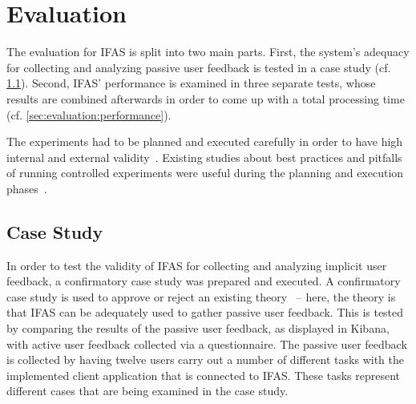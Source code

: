%
\chapter{Evaluation}
\label{ch:evaluation}

The evaluation for \acf{IFAS} is split into two main parts.
First, the system's adequacy for collecting and analyzing passive user feedback is tested in a case study (cf. \cref{sec:evaluation:user}).
Second, \ac{IFAS}' performance is examined in three separate tests, whose results are combined afterwards in order to come up with a total processing time (cf. \cref{sec:evaluation:performance}).


The experiments had to be planned and executed carefully in order to have high internal and external validity~\cite{Huitt2010}.
Existing studies about best practices and pitfalls of running controlled experiments were useful during the planning and execution phases~\cite{Kohavi2009}.


\section{Case Study}
\label{sec:evaluation:user}

In order to test the validity of \ac{IFAS} for collecting and analyzing implicit user feedback, a confirmatory case study was prepared and executed.
A confirmatory case study is used to approve or reject an existing theory~\cite{Easterbrook2008} -- here, the theory is that \ac{IFAS} can be adequately used to gather passive user feedback.
This is tested by comparing the results of the passive user feedback, as displayed in Kibana, with active user feedback collected via a questionnaire.
The passive user feedback is collected by having twelve users carry out a number of different tasks with the implemented client application that is connected to \ac{IFAS}.
These tasks represent different cases that are being examined in the case study.

